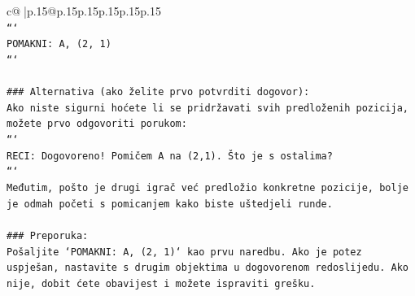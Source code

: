\documentclass{article}
\begin{document}
{\begin{supertabular}{c@{$\;$}|p{.15\linewidth}@{}p{.15\linewidth}p{.15\linewidth}p{.15\linewidth}p{.15\linewidth}p{.15\linewidth}}
{{{\\ 
\texttt{```} \\
\texttt{POMAKNI: A, (2, 1)} \\
\texttt{```} \\
\\ 
\texttt{\#\#\# Alternativa (ako želite prvo potvrditi dogovor):} \\
\texttt{Ako niste sigurni hoćete li se pridržavati svih predloženih pozicija, možete prvo odgovoriti porukom:} \\
\texttt{```} \\
\texttt{RECI: Dogovoreno! Pomičem A na (2,1). Što je s ostalima?} \\
\texttt{```} \\
\texttt{Međutim, pošto je drugi igrač već predložio konkretne pozicije, bolje je odmah početi s pomicanjem kako biste uštedjeli runde.} \\
\\ 
\texttt{\#\#\# Preporuka:} \\
\texttt{Pošaljite `POMAKNI: A, (2, 1)` kao prvu naredbu. Ako je potez uspješan, nastavite s drugim objektima u dogovorenom redoslijedu. Ako nije, dobit ćete obavijest i možete ispraviti grešku.} \\
            }
        }
    }
     \\ \\


\end{supertabular}}
\end{document}
